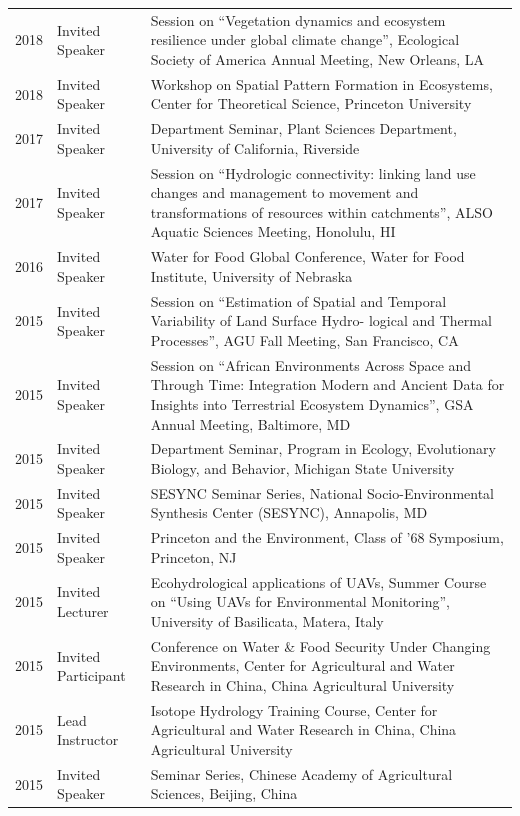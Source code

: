 \begin{longtable}{l p{3.0cm} p{11.5cm}}
2018 & Invited Speaker & Session on ``Vegetation dynamics and ecosystem resilience under global climate change'',  Ecological Society of America Annual Meeting, New Orleans, LA \\
2018 & Invited Speaker & Workshop on Spatial Pattern Formation in Ecosystems, Center for Theoretical Science, Princeton University \\
2017 & Invited Speaker & Department Seminar, Plant Sciences Department, University of California, Riverside \\
2017 & Invited Speaker & Session on ``Hydrologic connectivity: linking land use changes and management to movement and transformations of resources within catchments'',  ALSO Aquatic Sciences Meeting, Honolulu, HI \\
2016 & Invited Speaker & Water for Food Global Conference, Water for Food Institute, University of Nebraska \\
2015 & Invited Speaker & Session on ``Estimation of Spatial and Temporal Variability of Land Surface Hydro- logical and Thermal Processes'', AGU Fall Meeting, San Francisco, CA \\
2015 & Invited Speaker & Session on ``African Environments Across Space and Through Time: Integration Modern and Ancient Data for Insights into Terrestrial Ecosystem Dynamics'', GSA Annual Meeting, Baltimore, MD \\
2015 & Invited Speaker & Department Seminar, Program in Ecology, Evolutionary Biology, and Behavior, Michigan State University \\
2015 & Invited Speaker & SESYNC Seminar Series, National Socio-Environmental Synthesis Center (SESYNC), Annapolis, MD \\
2015 & Invited Speaker & Princeton and the Environment, Class of '68 Symposium, Princeton, NJ \\
2015 & Invited Lecturer & Ecohydrological applications of UAVs, Summer Course on ``Using UAVs for Environmental Monitoring'', University of Basilicata, Matera, Italy \\
2015 & Invited Participant & Conference on Water \& Food Security Under Changing Environments, Center for Agricultural and Water Research in China, China Agricultural University \\
2015 & Lead Instructor & Isotope Hydrology Training Course, Center for Agricultural and Water Research in China, China Agricultural University \\
2015 & Invited Speaker & Seminar Series, Chinese Academy of Agricultural Sciences, Beijing, China \\

\end{longtable}
